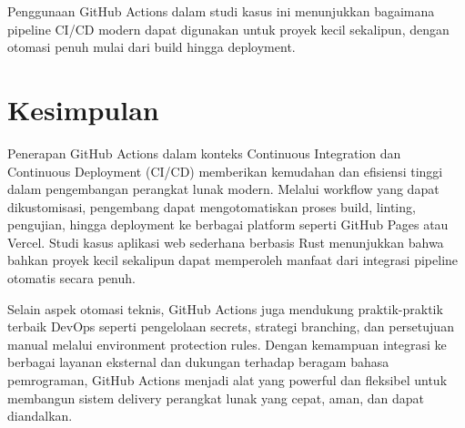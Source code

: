 Penggunaan GitHub Actions dalam studi kasus ini menunjukkan bagaimana pipeline CI/CD modern dapat digunakan untuk proyek kecil sekalipun, dengan otomasi penuh mulai dari build hingga deployment.


\section{Kesimpulan}

Penerapan GitHub Actions dalam konteks Continuous Integration dan Continuous Deployment (CI/CD) memberikan kemudahan dan efisiensi tinggi dalam pengembangan perangkat lunak modern. Melalui workflow yang dapat dikustomisasi, pengembang dapat mengotomatiskan proses build, linting, pengujian, hingga deployment ke berbagai platform seperti GitHub Pages atau Vercel. Studi kasus aplikasi web sederhana berbasis Rust menunjukkan bahwa bahkan proyek kecil sekalipun dapat memperoleh manfaat dari integrasi pipeline otomatis secara penuh.

Selain aspek otomasi teknis, GitHub Actions juga mendukung praktik-praktik terbaik DevOps seperti pengelolaan secrets, strategi branching, dan persetujuan manual melalui environment protection rules. Dengan kemampuan integrasi ke berbagai layanan eksternal dan dukungan terhadap beragam bahasa pemrograman, GitHub Actions menjadi alat yang powerful dan fleksibel untuk membangun sistem delivery perangkat lunak yang cepat, aman, dan dapat diandalkan.

